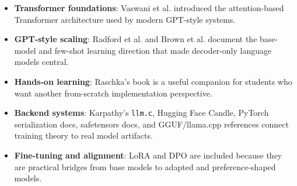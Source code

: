 \documentclass[11pt,oneside]{book}
\newcommand{\term}[1]{\textbf{#1}}
\begin{document}
\begin{itemize}
  \item \term{Transformer foundations}: Vaswani et al. introduced the attention-based Transformer architecture used by modern GPT-style systems.
  \item \term{GPT-style scaling}: Radford et al. and Brown et al. document the base-model and few-shot learning direction that made decoder-only language models central.
  \item \term{Hands-on learning}: Raschka's book is a useful companion for students who want another from-scratch implementation perspective.
  \item \term{Backend systems}: Karpathy's \texttt{llm.c}, Hugging Face Candle, PyTorch serialization docs, safetensors docs, and GGUF/llama.cpp references connect training theory to real model artifacts.
  \item \term{Fine-tuning and alignment}: LoRA and DPO are included because they are practical bridges from base models to adapted and preference-shaped models.
\end{itemize}

\nocite{raschka2025llmfromscratch,vaswani2017attention,radford2019language,brown2020language,hu2021lora,rafailov2023dpo,karpathyllmc,huggingfacecandle,pytorchsavingloading,huggingfacesafetensors,ggufspec,llamacppconvertgguf}


\end{document}
